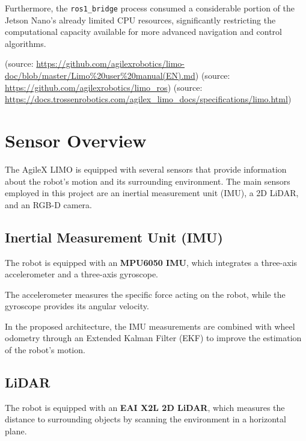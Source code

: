 \documentclass[a4paper,11pt,oneside]{book}
\begin{document}
Furthermore, the \texttt{ros1\_bridge} process consumed a
considerable portion of the Jetson Nano's already limited CPU
resources, significantly restricting the computational capacity
available for more advanced navigation and control algorithms.


(source: \url{https://github.com/agilexrobotics/limo-doc/blob/master/Limo\%20user\%20manual(EN).md})
(source: \url{https://github.com/agilexrobotics/limo_ros})
(source: \url{https://docs.trossenrobotics.com/agilex_limo_docs/specifications/limo.html})

\section{Sensor Overview}

The AgileX LIMO is equipped with several sensors that provide
information about the robot's motion and its surrounding
environment. The main sensors employed in this project are
an inertial measurement unit (IMU), a 2D LiDAR, and an
RGB-D camera.

\subsection{Inertial Measurement Unit (IMU)}

The robot is equipped with an \textbf{MPU6050 IMU}, which
integrates a three-axis accelerometer and a three-axis
gyroscope.

The accelerometer measures the specific force acting on
the robot, while the gyroscope provides its angular
velocity.

In the proposed architecture, the IMU measurements are
combined with wheel odometry through an Extended Kalman
Filter (EKF) to improve the estimation of the robot's
motion.

\subsection{LiDAR}

The robot is equipped with an \textbf{EAI X2L 2D LiDAR},
which measures the distance to surrounding objects
by scanning the environment in a horizontal plane.
\end{document}
